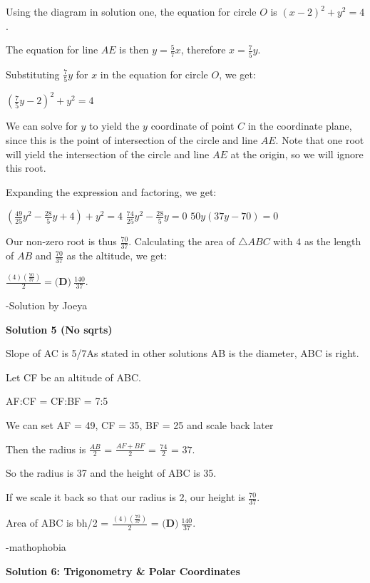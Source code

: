 \begin{enumerate}
 Using the diagram in solution one, the equation for circle $O$ is $(x-2)^2+y^2 = 4$. 

 The equation for line $AE$ is then $y = \frac{5}{7}x$, therefore $x = \frac{7}{5}y$.

 Substituting $\frac{7}{5}y$ for $x$ in the equation for circle $O$, we get:

 $\left(\frac{7}{5}y-2\right)^2+y^2 = 4$

 We can solve for $y$ to yield the $y$ coordinate of point $C$ in the coordinate plane, since this is the point of intersection of the circle and line $AE$. Note that one root will yield the intersection of the circle and line $AE$ at the origin, so we will ignore this root.

 Expanding the expression and factoring, we get:

 $\left(\frac{49}{25}y^2-\frac{28}{5}y+4\right)+y^2 = 4$
$\frac{74}{25}y^2-\frac{28}{5}y = 0$
$50y(37y-70) = 0$

 Our non-zero root is thus $\frac{70}{37}$. Calculating the area of $\triangle ABC$ with $4$ as the length of $AB$ and $\frac{70}{37}$ as the altitude, we get:

 $\frac{(4)(\frac{70}{37})}{2} = \boxed{\textbf{(D)}\ \frac{140}{37}}$.

 -Solution by Joeya

 



\textbf{Solution 5 (No sqrts)}

Slope of AC is 5/7As stated in other solutions AB is the diameter, ABC is right.

 Let CF be an altitude of ABC.

 AF:CF = CF:BF = 7:5 

 We can set AF = 49, CF = 35, BF = 25 and scale back later

 Then the radius is $\frac{AB}{2}$ = $\frac{AF+BF}{2}$ = $\frac{74}{2}$ = $37$. 

 So the radius is 37 and the height of ABC is 35.

 If we scale it back so that our radius is 2, our height is $\frac{70}{37}$.

 Area of ABC is bh/2 = $\frac{(4)(\frac{70}{37})}{2}$ = $\boxed{\textbf{(D)}\ \frac{140}{37}}$.

 -mathophobia

 



\textbf{Solution 6: Trigonometry & Polar Coordinates}


\end{enumerate}

